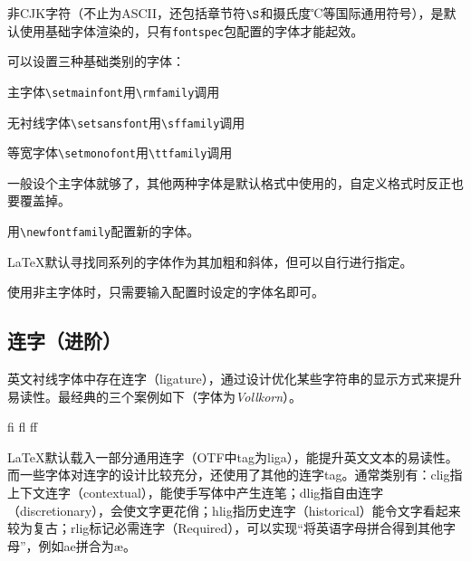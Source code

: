 \documentclass[10pt,openany]{book}
\begin{document}
非CJK字符（不止为ASCII，还包括章节符\(\S\)和摄氏度℃等国际通用符号），是默认使用基础字体渲染的，只有\texttt{fontspec}包配置的字体才能起效。



可以设置三种基础类别的字体：

\begin{tightitem}
    \item 主字体\texttt{\textbackslash{}setmainfont}用\texttt{\textbackslash{}rmfamily}调用
    \item 无衬线字体\texttt{\textbackslash{}setsansfont}用\texttt{\textbackslash{}sffamily}调用
    \item 等宽字体\texttt{\textbackslash{}setmonofont}用\texttt{\textbackslash{}ttfamily}调用
\end{tightitem}

一般设个主字体就够了，其他两种字体是默认格式中使用的，自定义格式时反正也要覆盖掉。

用\texttt{\textbackslash{}newfontfamily}配置新的字体。



{\LaTeX}默认寻找同系列的字体作为其加粗和斜体，但可以自行进行指定。



使用非主字体时，只需要输入配置时设定的字体名即可。



\subsection{连字（进阶）}

英文衬线字体中存在连字（ligature），通过设计优化某些字符串的显示方式来提升易读性。最经典的三个案例如下（字体为\textit{Vollkorn}）。

\begin{minipage}[c][3\baselineskip]{30\ccwd}
    \centering{}\Huge fi fl ff
\end{minipage}

{\LaTeX}默认载入一部分通用连字（OTF中tag为liga），能提升英文文本的易读性。而一些字体对连字的设计比较充分，还使用了其他的连字tag。通常类别有：clig指上下文连字（contextual），能使手写体中产生连笔；dlig指自由连字（discretionary），会使文字更花俏；hlig指历史连字（historical）能令文字看起来较为复古；rlig标记必需连字（Required），可以实现“将英语字母拼合得到其他字母”，例如ae拼合为æ。
\end{document}
